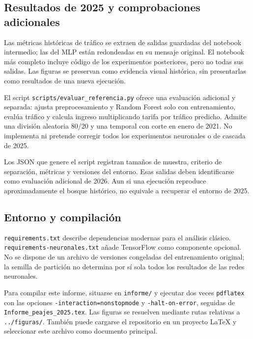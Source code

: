 \documentclass[11pt,a4paper]{article}
\newcommand{\campo}[1]{\nolinkurl{#1}}
\begin{document}
\subsection{Resultados de 2025 y comprobaciones adicionales}
Las métricas históricas de tráfico se extraen de salidas guardadas del notebook intermedio; las del MLP están redondeadas en su mensaje original. El notebook más completo incluye código de los experimentos posteriores, pero no todas sus salidas. Las figuras se preservan como evidencia visual histórica, sin presentarlas como resultados de una nueva ejecución.

El script \campo{scripts/evaluar_referencia.py} ofrece una evaluación adicional y separada: ajusta preprocesamiento y Random Forest solo con entrenamiento, evalúa tráfico y calcula ingreso multiplicando tarifa por tráfico predicho. Admite una división aleatoria 80/20 y una temporal con corte en enero de 2021. No implementa ni pretende corregir todos los experimentos neuronales o de cascada de 2025.

Los JSON que genere el script registran tamaños de muestra, criterio de separación, métricas y versiones del entorno. Esas salidas deben identificarse como evaluación adicional de 2026. Aun si una ejecución reproduce aproximadamente el bosque histórico, no equivale a recuperar el entorno de 2025.

\subsection{Entorno y compilación}
\campo{requirements.txt} describe dependencias modernas para el análisis clásico. \campo{requirements-neuronales.txt} añade TensorFlow como componente opcional. No se dispone de un archivo de versiones congeladas del entrenamiento original; la semilla de partición no determina por sí sola todos los resultados de las redes neuronales.

Para compilar este informe, situarse en \campo{informe/} y ejecutar dos veces \campo{pdflatex} con las opciones \campo{-interaction=nonstopmode} y \campo{-halt-on-error}, seguidas de \campo{Informe_peajes_2025.tex}. Las figuras se resuelven mediante rutas relativas a \campo{../figuras/}. También puede cargarse el repositorio en un proyecto LaTeX y seleccionar este archivo como documento principal.
\end{document}
